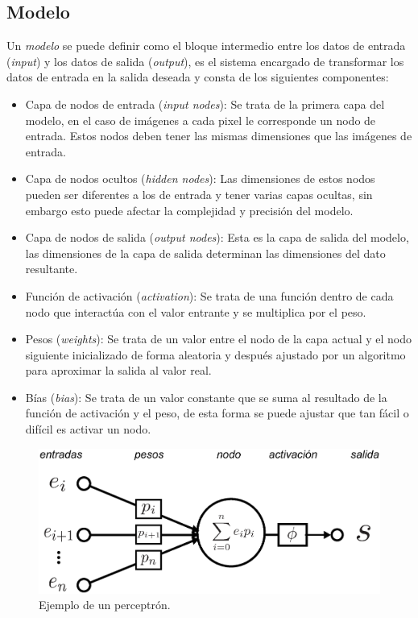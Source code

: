 
\subsection{Modelo}
Un \emph{modelo} se puede definir como el bloque intermedio entre los datos de entrada (\emph{input}) y los datos de salida (\emph{output}), es el sistema encargado de transformar los datos de entrada en la salida deseada y consta de los siguientes componentes:

\begin{itemize}
    \item Capa de nodos de entrada (\emph{input nodes}): Se trata de la primera capa del modelo, en el caso de imágenes a cada pixel le corresponde un nodo de entrada. Estos nodos deben tener las mismas dimensiones que las imágenes de entrada.
    \item Capa de nodos ocultos (\emph{hidden nodes}): Las dimensiones de estos nodos pueden ser diferentes a los de entrada y tener varias capas ocultas, sin embargo esto puede afectar la complejidad y precisión del modelo.
    \item Capa de nodos de salida (\emph{output nodes}): Esta es la capa de salida del modelo, las dimensiones de la capa de salida determinan las dimensiones del dato resultante.
    \item Función de activación (\emph{activation}): Se trata de una función dentro de cada nodo que interactúa con el valor entrante y se multiplica por el peso.
    \item Pesos (\emph{weights}): Se trata de un valor entre el nodo de la capa actual y el nodo siguiente inicializado de forma aleatoria y después ajustado por un algoritmo para aproximar la salida al valor real.
    \item Bías (\emph{bias}): Se trata de un valor constante que se suma al resultado de la función de activación y el peso, de esta forma se puede ajustar que tan fácil o difícil es activar un nodo.
\end{itemize}

\begin{figure}[h!]
    \includegraphics[width=120mm]{Figuras/neural_network.eps}
    \centering
    \caption{Ejemplo de un perceptrón.}
    \label{fig:percep}
\end{figure}

